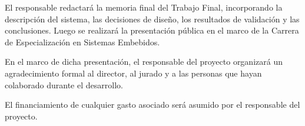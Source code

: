 \documentclass[
11pt, %
]{charter}
\begin{document}
\begin{enumerate}
	El responsable redactará la memoria final del Trabajo Final, incorporando la descripción del sistema, las decisiones de diseño, los resultados de validación y las conclusiones. Luego se realizará la presentación pública en el marco de la Carrera de Especialización en Sistemas Embebidos.

	En el marco de dicha presentación, el responsable del proyecto organizará un agradecimiento formal al director, al jurado y a las personas que hayan colaborado durante el desarrollo.

	El financiamiento de cualquier gasto asociado será asumido por el responsable del proyecto.
\end{enumerate}
\end{document}
